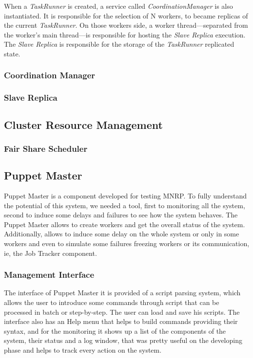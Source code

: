 \documentclass[times, 10pt,twocolumn]{article}
\begin{document}
            When a \textit{TaskRunner} is created, a service called \textit{CoordinationManager} is also instantiated. It is responsible for the selection of N workers, to became replicas of the current \textit{TaskRunner}. On those workers side, a worker thread—separated from the worker's main thread—is responsible for hosting the \textit{Slave Replica} execution. The \textit{Slave Replica} is responsible for the storage of the \textit{TaskRunner} replicated state.
         
        	\subsubsection{Coordination Manager}
        	
        	\subsubsection{Slave Replica}
    	
    	\subsection{Cluster Resource Management}
    	
            \subsubsection{Fair Share Scheduler}
        
    	\subsection{Puppet Master}
	      Puppet Master is a component developed for testing \ac{MNRP}. To fully understand the potential of this system, we needed a tool, first to monitoring all the system, second to induce some delays and failures to see how the system behaves. The Puppet Master allows to create workers and get the overall status of the system. Additionally, allows to induce some delay on the whole system or only in some workers and even to simulate some failures freezing workers or its communication, ie, the Job Tracker component.
            \subsubsection{Management Interface}
            The interface of Puppet Master it is provided of a script parsing system, which allows the user to introduce some commands through script that can be processed in batch or step-by-step. The user can load and save his scripts. The interface also has an Help menu that helps to build commands providing their syntax, and for the monitoring it shows up a list of the components of the system, their status and a log window, that was pretty useful on the developing phase and helps to track every action on the system.
\end{document}
